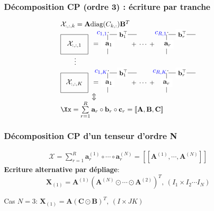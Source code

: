\documentclass[9pt,table]{beamer} %
\newcommand{\cpd}[3]{[\![#1, #2, #3]\!]}
\newcommand{\bfa}{\mathbf{a}}
\newcommand{\bfb}{\mathbf{b}}
\newcommand{\bfc}{\mathbf{c}}
\newcommand{\matr}[1]{\mathbf{#1}}
\newcommand{\T}{\top}
\begin{document}
\begin{frame}
\frametitle{Décomposition CP (ordre 3) : écriture par tranche}

\[
\begin{array}{c@{}l}
&\mathcal{X}_{:,:,k} = \mathbf{A} \text{diag}(C_{k,:}) \mathbf{B}^{T}\\
 & 
\raisebox{-0.35\height}{\begin{tikzpicture}
\draw(0,0.5) node (A) {$\mathcal{X}_{:,:,1}$};
\draw(-0.7,0) rectangle (0.7,1);
\draw(1.1,0.5) node (eq) {${=}$};
\draw(1.7,0) -- (1.7,1);
\draw(1.7,0.5) node[fill=white] (a1) {{ $\bfa_1$}};
\draw(1.8,1) -- (3.18,1);
\draw(2.45,1) node[fill=white] (b1) {{\small $\bfb_1^{\top}\!\!$}};
\draw(3.5,0.5) node () {{\small $+\; \cdots\;+$}};
\draw(4.7,0) -- (4.7,1);
\draw(4.7,0.5) node[fill=white] (a1) {{ $\bfa_r$}};
\draw(4.8,1) -- (6.18,1);
\draw(5.45,1) node[fill=white] (b1) {{\small $\bfb_r^{\top}\!\!$}};

\draw(1.4,1.05) node (eq) {{ $\textcolor{blue}{c_{1,1}}\cdot$}};
\draw(4.4,1.05) node (eq) {{ $\textcolor{blue}{c_{R,1}}\cdot$}};
\end{tikzpicture}} \\
 & \qquad{\vdots} \\
& 
{\raisebox{-0.35\height}{\begin{tikzpicture}
\draw(0,0.5) node (A) {$\mathcal{X}_{:,:,K}$};
\draw(-0.7,0) rectangle (0.7,1);
\draw(1.1,0.5) node (eq) {${=}$};
\draw(1.7,0) -- (1.7,1);
\draw(1.7,0.5) node[fill=white] (a1) {{ $\bfa_1$}};
\draw(1.8,1) -- (3.18,1);
\draw(2.45,1) node[fill=white] (b1) {{\small $\bfb_1^{\T}\!\!$}};
\draw(3.5,0.5) node () {{\small $+\; \cdots\;+$}};
\draw(4.7,0) -- (4.7,1);
\draw(4.7,0.5) node[fill=white] (a1) {{$\bfa_r$}};
\draw(4.8,1) -- (6.18,1);
\draw(5.45,1) node[fill=white] (b1) {{\small $\bfb_r^{\T}\!\!$}};
\draw(1.35,1.05) node (eq) {{ $\textcolor{blue}{c_{1,K}}\cdot$}};
\draw(4.35,1.05) node (eq) {{ $\textcolor{blue}{c_{R,K}}\cdot$}};
\end{tikzpicture}}} \\
& \qquad\qquad\;\; {\Updownarrow} \\
& \Xx = \sum\limits_{r=1}^{R} \bfa_r \circ \bfb_r \circ \bfc_r = \cpd{\matr{A}}{\matr{B}}{\matr{C}}
\\
\end{array}
\]
\end{frame}


\begin{frame}
\frametitle{Décomposition CP d'un tenseur d'ordre N}
\begin{gather*} 
\mathcal{X} = \sum_{r=1}^R  \mathbf{a}_{r}^{(1)} \circ \cdots \circ \mathbf{a}_{r}^{(N)}=[\![ \mathbf{A}^{(1)}, \cdots , \mathbf{A}^{(N)}]\!] 
\end{gather*}
\textbf{Ecriture alternative par dépliage}: 
\[
\mathbf{X}_{(1)} =\mathbf{A}^{(1)}  (\mathbf{A}^{(N)} \odot \cdots \odot \mathbf{A}^{(2)})^T, \ {(I_1 \times I_2 \cdots I_N)}
\]


Cas $N=3$: $\mathbf{X}_{(1)} =\mathbf{A}   (\mathbf{C} \odot \mathbf{B})^T, \ {(I \times JK)}$
\end{frame}
\end{document}
